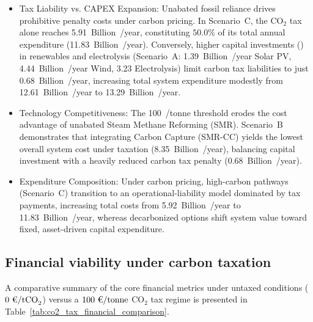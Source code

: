 \documentclass[preprint,12pt]{elsarticle}
\begin{document}
\begin{itemize}
    \item {Tax Liability vs. CAPEX Expansion:} Unabated fossil reliance drives prohibitive penalty costs under carbon pricing. In Scenario~C, the CO$_2$ tax alone reaches 5.91~Billion~\texteuro/year, constituting $50.0\%$ of its total annual expenditure (11.83~Billion~\texteuro/year). Conversely, higher capital investments () in renewables and electrolysis (Scenario~A: 1.39~Billion~\texteuro/year Solar PV, 4.44~Billion~\texteuro/year Wind, 3.23 Electrolysis) limit carbon tax liabilities to just 0.68~Billion~\texteuro/year, increasing total system expenditure modestly from 12.61~Billion~\texteuro/year to 13.29~Billion~\texteuro/year.
    \item {Technology Competitiveness:} The 100~\texteuro/tonne threshold erodes the cost advantage of unabated Steam Methane Reforming (SMR). Scenario~B demonstrates that integrating Carbon Capture (SMR-CC) yields the lowest overall system cost under taxation (8.35~Billion~\texteuro/year), balancing capital investment with a heavily reduced carbon tax penalty (0.68~Billion~\texteuro/year).
    \item {Expenditure Composition:} Under carbon pricing, high-carbon pathways (Scenario~C) transition to an operational-liability model dominated by tax payments, increasing total costs from 5.92~Billion~\texteuro/year to 11.83~Billion~\texteuro/year, whereas decarbonized options shift system value toward fixed, asset-driven capital expenditure.
\end{itemize}


\subsection{Financial viability under carbon taxation}
A comparative summary of the core financial metrics under untaxed conditions ($0\text{~\texteuro/tCO}_2$) versus a $100\text{~\texteuro/tonne}$ $\text{CO}_2$ tax regime is presented in Table~\ref{tab:co2_tax_financial_comparison}.
\end{document}
